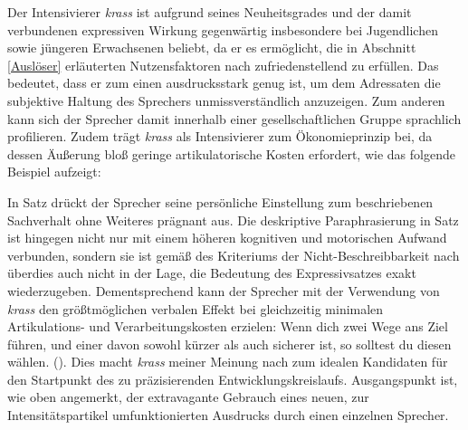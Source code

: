 Der Intensivierer \textit{krass} ist aufgrund seines Neuheitsgrades und der damit verbundenen expressiven Wirkung gegenwärtig insbesondere bei Jugendlichen sowie jüngeren Erwachsenen beliebt, da er es ermöglicht, die in Abschnitt \ref{Auslöser} erläuterten Nutzensfaktoren nach \citet[189ff.]{Kirschbaum.2002b} zufriedenstellend zu erfüllen. Das bedeutet, dass er zum einen ausdrucksstark genug ist, um dem Adressaten die subjektive Haltung des Sprechers unmissverständlich anzuzeigen. Zum anderen kann sich der Sprecher damit innerhalb einer gesellschaftlichen Gruppe sprachlich profilieren. Zudem trägt \textit{krass} als Intensivierer zum Ökonomieprinzip bei, da dessen Äußerung bloß geringe artikulatorische Kosten erfordert, wie das folgende {Beispiel aufzeigt}:

\ea  \label{konzert}
 \z
 \z
In Satz  drückt der Sprecher seine persönliche Einstellung zum beschriebenen Sachverhalt ohne Weiteres prägnant aus. Die deskriptive Paraphrasierung in Satz  ist hingegen nicht nur mit einem höheren kognitiven und motorischen Aufwand verbunden, sondern sie ist gemäß des Kriteriums der Nicht-Beschreibbarkeit nach \citet[]{Potts.2007a} überdies auch nicht in der Lage, die Bedeutung des Expressivsatzes exakt wiederzugeben. Dementsprechend kann der Sprecher mit der Verwendung von \textit{krass} den größtmöglichen verbalen Effekt bei gleichzeitig minimalen Artikulations- und Verarbeitungskosten erzielen: \glqq{}Wenn dich zwei Wege ans Ziel führen, und einer davon sowohl kürzer als auch sicherer ist, so solltest du diesen wählen.\grqq{} (\citealt[221]{Keller.1995}). Dies macht \textit{krass} meiner Meinung nach zum idealen Kandidaten für den Startpunkt des zu präzisierenden Entwicklungskreislaufs. Ausgangspunkt ist, wie oben angemerkt, der extravagante Gebrauch eines neuen, zur Intensitätspartikel umfunktionierten Ausdrucks durch einen einzelnen Sprecher.



